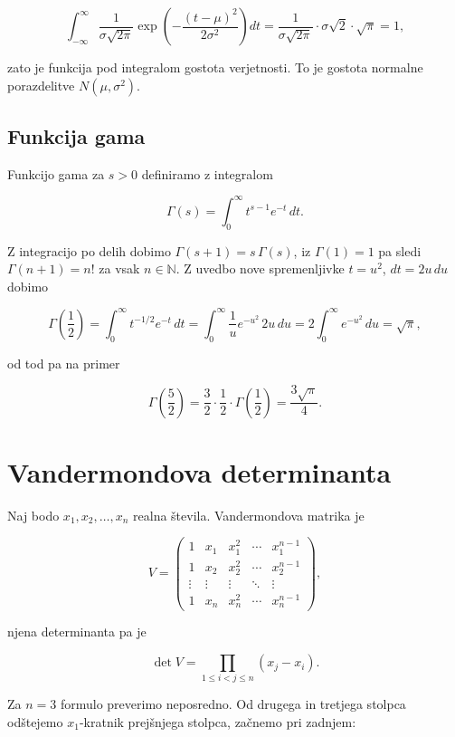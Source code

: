 \documentclass[a4paper]{article}
\begin{document}
\[\int_{-\infty}^{\infty} \frac{1}{\sigma \sqrt{2\pi}} \exp\left( -\frac{(t - \mu)^2}{2\sigma^2} \right) dt = \frac{1}{\sigma \sqrt{2\pi}} \cdot \sigma \sqrt{2} \cdot \sqrt{\pi} = 1,\]

zato je funkcija pod integralom gostota verjetnosti. To je gostota
normalne porazdelitve \(N(\mu, \sigma^2)\).

\subsection{Funkcija gama}\label{funkcija-gama}

Funkcijo gama za \(s > 0\) definiramo z integralom

\[\Gamma(s) = \int_{0}^{\infty} t^{s - 1} e^{-t} \, dt.\]

Z integracijo po delih dobimo \(\Gamma(s + 1) = s \, \Gamma(s)\), iz
\(\Gamma(1) = 1\) pa sledi \(\Gamma(n + 1) = n!\) za vsak
\(n \in \mathbb{N}\). Z uvedbo nove spremenljivke \(t = u^2\),
\(dt = 2u \, du\) dobimo

\[\Gamma\left( \frac{1}{2} \right) = \int_{0}^{\infty} t^{-1/2} e^{-t} \, dt = \int_{0}^{\infty} \frac{1}{u} e^{-u^2} \, 2u \, du = 2 \int_{0}^{\infty} e^{-u^2} \, du = \sqrt{\pi},\]

od tod pa na primer

\[\Gamma\left( \frac{5}{2} \right) = \frac{3}{2} \cdot \frac{1}{2} \cdot \Gamma\left( \frac{1}{2} \right) = \frac{3\sqrt{\pi}}{4}.\]

\section{Vandermondova determinanta}\label{vandermondova-determinanta}

Naj bodo \(x_1, x_2, \ldots, x_n\) realna števila. Vandermondova matrika
je

\[V = \begin{pmatrix}
1 & x_1 & x_1^2 & \cdots & x_1^{n-1} \\
1 & x_2 & x_2^2 & \cdots & x_2^{n-1} \\
\vdots & \vdots & \vdots & \ddots & \vdots \\
1 & x_n & x_n^2 & \cdots & x_n^{n-1}
\end{pmatrix},\]

njena determinanta pa je

\[\det V = \prod_{1 \leq i < j \leq n} (x_j - x_i).\]

Za \(n = 3\) formulo preverimo neposredno. Od drugega in tretjega
stolpca odštejemo \(x_1\)-kratnik prejšnjega stolpca, začnemo pri
zadnjem:
\end{document}
